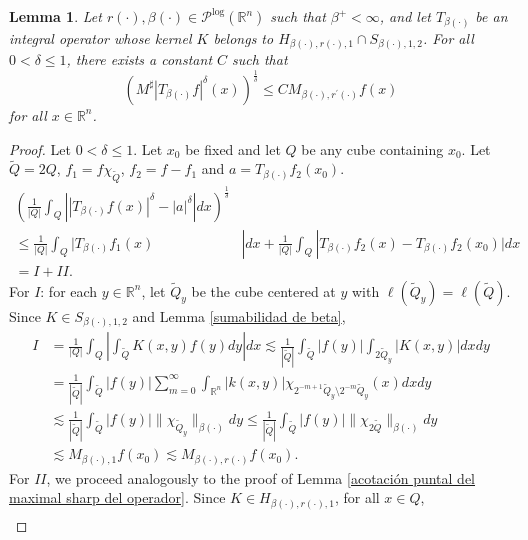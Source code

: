 \documentclass[a4paper,11pt,reqno]{amsart}
\theoremstyle{plain}
\numberwithin{equation}{section}
\newtheorem{lema}[teo]{Lemma}
\theoremstyle{definition}
\newcommand{\R}{{\mathbb{R}^n}}
\begin{document}
\begin{lema} \label{acotación puntal del maximal sharp del operador fraccionario} 
Let $r(\cdot),\beta(\cdot)\in\mathcal{P}^{\log}(\R)$ such that $\beta^+<\infty$, and let $T_{\beta(\cdot)}$ be an integral operator whose kernel $K$ belongs to $H_{\beta(\cdot),r(\cdot),1}\cap S_{\beta(\cdot),1,2}$. For all $0<\delta\leq1$, there exists a constant $C$ such that
	\begin{equation*}
	\left(M^\sharp\left|T_{\beta(\cdot)}f\right|^\delta(x)\right)^\frac{1}{\delta}\leq C M_{{\beta(\cdot)},{r^\prime(\cdot)}}f(x)
	\end{equation*}
	for all $x\in\R$.
\end{lema}
\begin{proof}
	Let $0<\delta\leq1$. Let $x_0$ be fixed and let $Q$ be any cube containing $x_0$. Let ${\tilde{Q}}=2Q$, $f_1=f\chi_{\tilde{Q}}$, $f_2=f-f_1$ and $a=T_{\beta(\cdot)}f_2(x_0)$.
	\begin{align*}
	\left(\frac{1}{|Q|}\int_Q\left||T_{\beta(\cdot)}f(x)|^\delta-|a|^\delta\right|dx\right)^\frac{1}{\delta}\\
	\leq\frac{1}{|Q|}\int_Q|T_{\beta(\cdot)}f_1(x)&|dx+\frac{1}{|Q|}\int_Q|T_{\beta(\cdot)}f_2(x)-T_{\beta(\cdot)}f_2(x_0)|dx\\
	=I+II.\ \qquad \qquad&
	\end{align*}
	For $I$: for each $y\in \R$, let $\tilde{Q}_y$ be the cube centered at $y$ with $\ell(\tilde{Q}_y)=\ell(\tilde{Q})$. Since $K\in S_{{\beta(\cdot)},1,2}$ and Lemma \ref{sumabilidad de beta},
	\begin{align*}
		I&=\frac{1}{|Q|}\int_Q\left|\int_{\tilde{Q}}K(x,y)f(y)dy\right|dx\lesssim\frac{1}{|\tilde{Q}|}\int_{\tilde{Q}}|f(y)|\int_{2\tilde{Q}_y}|K(x,y)|dx dy\\
		&=\frac{1}{|\tilde{Q}|}\int_{\tilde{Q}}|f(y)|\sum_{m=0}^{\infty}\int_{\R}|k(x,y)|\chi_{2^{-m+1}\tilde{Q}_y\setminus2^{-m}\tilde{Q}_y}(x)dxdy\\
		&\lesssim\frac{1}{|\tilde{Q}|}\int_{\tilde{Q}}|f(y)|\|\chi_{\tilde{Q}_y}\|_{\beta(\cdot)}dy\leq\frac{1}{|\tilde{Q}|}\int_{\tilde{Q}}|f(y)|\|\chi_{2\tilde{Q}}\|_{\beta(\cdot)}dy\\
		&\lesssim M_{{\beta(\cdot)},1}f(x_0)\lesssim  M_{{\beta(\cdot)},{r(\cdot)}}f(x_0).
	\end{align*}
	For $II$, we proceed analogously to the proof of Lemma \ref{acotación puntal del maximal sharp del operador}. Since $K\in H_{\beta(\cdot),r(\cdot),1}$, for all $x\in Q$,
	\begin{align*}

\end{align*}
\end{proof}
\end{document}

